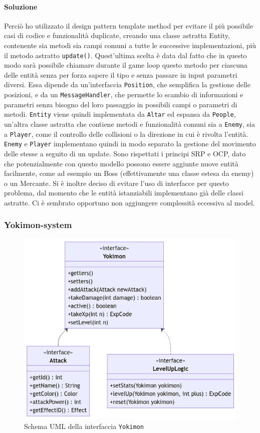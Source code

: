 \documentclass[a4paper,12pt]{report}
\begin{document}
\paragraph{Soluzione} Perciò ho utilizzato il design pattern template method per evitare il più possibile casi di codice e funzionalità duplicate, creando una classe astratta Entity, contenente sia metodi sia campi comuni a tutte le successive implementazioni, più il metodo astratto \texttt{update()}. 
%
Quest’ultima scelta è data dal fatto che in questo modo sarà possibile chiamare durante il game loop questo metodo per ciascuna delle entità senza per forza sapere il tipo e senza passare in input parametri diversi. Essa dipende da un’interfaccia \texttt{Position}, che semplifica la gestione delle posizioni, e da un \texttt{MessageHandler}, che permette lo scambio di informazioni e parametri senza bisogno del loro passaggio in possibili campi o parametri di metodi. 
%
\texttt{Entity} viene quindi implementata da \texttt{Altar} ed espansa da \texttt{People}, un'altra classe astratta che contiene metodi e funzionalità comuni sia a \texttt{Enemy}, sia a \texttt{Player}, come il controllo delle collisioni o la direzione in cui è rivolta l’entità. 
%
\texttt{Enemy} e \texttt{Player} implementano quindi in modo separato la gestione del movimento delle stesse a seguito di un update. 
%
Sono rispettati i principi SRP e OCP, dato che potenzialmente con questo modello possono essere aggiunte nuove entità facilmente, come ad esempio un Boss (effettivamente una classe estesa da enemy) o un Mercante. 
%
Si è inoltre deciso di evitare l’uso di interfacce per questo problema, dal momento che le entità istanziabili implementano già delle classi astratte. Ci è sembrato opportuno non aggiungere complessità eccessiva al model.
\subsubsection{Yokimon-system}
\begin{figure}[H]
\centering{}
\includegraphics[width=1.0\columnwidth]{images/uml-yokimon.png}
\caption{Schema UML della interfaccia \texttt{Yokimon}}
\label{img:uml-yokimon}
\end{figure}
\end{document}
